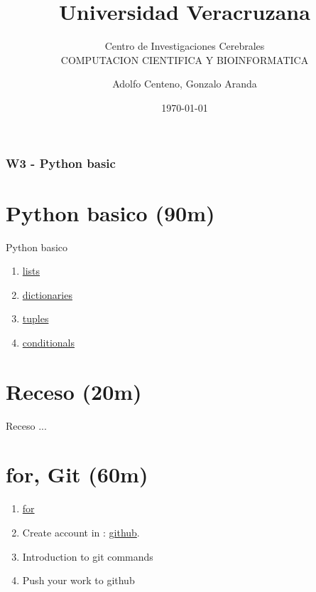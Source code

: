 \documentclass{beamer}
\begin{document}
\title{Universidad Veracruzana}  
\subtitle{Centro de Investigaciones Cerebrales\\COMPUTACION CIENTIFICA Y BIOINFORMATICA}
\author{Adolfo Centeno, Gonzalo Aranda}
\date{\today} 

\begin{frame}
\titlepage
\end{frame}

\begin{frame}\frametitle{W3 - Python basic}
\tableofcontents
\end{frame} 


\section{Python basico (90m) }

\begin{frame}


Python basico

\begin{enumerate}
\item
	\href{https://github.com/adsoftsito/python/blob/master/w3/lists.py}{lists}

\item
	 \href{https://github.com/adsoftsito/python/blob/master/w3/dictionaries.py}{dictionaries}
\item
	\href{https://github.com/adsoftsito/python/blob/master/w3/tuples.py}{tuples}
\item
	\href{https://github.com/adsoftsito/python/blob/master/w3/conditionals.py}{conditionals}
	
\end{enumerate} 


\end{frame}


\section{Receso  (20m) }

\begin{frame}


Receso ...

\end{frame}


\section{for, Git (60m) }

\begin{frame}

\begin{enumerate}
\item
	\href{https://github.com/adsoftsito/python/blob/master/w3/for.py}{for}

\item
	Create account in  : \href{https://github.com}{github}.
\item
	Introduction to git commands
\item
	Push your work to github

\end{enumerate} 


\end{frame}
\end{document}
